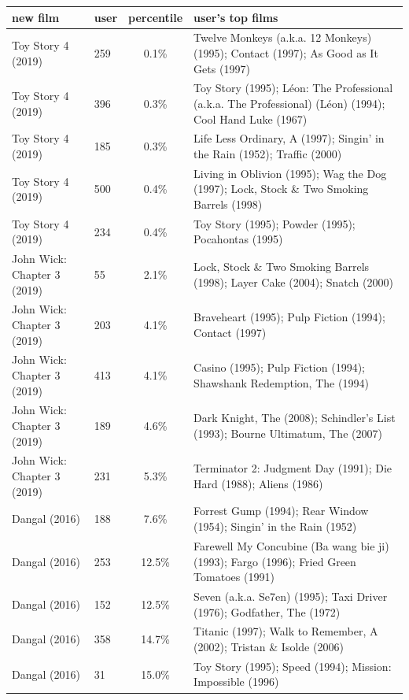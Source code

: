 \begin{tabular}{llcp{6cm}}
\toprule
new film & user & percentile & user's top films \\
\midrule
Toy Story 4 (2019) & 259 & 0.1\% & Twelve Monkeys (a.k.a. 12 Monkeys) (1995); Contact (1997); As Good as It Gets (1997) \\
Toy Story 4 (2019) & 396 & 0.3\% & Toy Story (1995); Léon: The Professional (a.k.a. The Professional) (Léon) (1994); Cool Hand Luke (1967) \\
Toy Story 4 (2019) & 185 & 0.3\% & Life Less Ordinary, A (1997); Singin' in the Rain (1952); Traffic (2000) \\
Toy Story 4 (2019) & 500 & 0.4\% & Living in Oblivion (1995); Wag the Dog (1997); Lock, Stock \& Two Smoking Barrels (1998) \\
Toy Story 4 (2019) & 234 & 0.4\% & Toy Story (1995); Powder (1995); Pocahontas (1995) \\
John Wick: Chapter 3 (2019) & 55 & 2.1\% & Lock, Stock \& Two Smoking Barrels (1998); Layer Cake (2004); Snatch (2000) \\
John Wick: Chapter 3 (2019) & 203 & 4.1\% & Braveheart (1995); Pulp Fiction (1994); Contact (1997) \\
John Wick: Chapter 3 (2019) & 413 & 4.1\% & Casino (1995); Pulp Fiction (1994); Shawshank Redemption, The (1994) \\
John Wick: Chapter 3 (2019) & 189 & 4.6\% & Dark Knight, The (2008); Schindler's List (1993); Bourne Ultimatum, The (2007) \\
John Wick: Chapter 3 (2019) & 231 & 5.3\% & Terminator 2: Judgment Day (1991); Die Hard (1988); Aliens (1986) \\
Dangal (2016) & 188 & 7.6\% & Forrest Gump (1994); Rear Window (1954); Singin' in the Rain (1952) \\
Dangal (2016) & 253 & 12.5\% & Farewell My Concubine (Ba wang bie ji) (1993); Fargo (1996); Fried Green Tomatoes (1991) \\
Dangal (2016) & 152 & 12.5\% & Seven (a.k.a. Se7en) (1995); Taxi Driver (1976); Godfather, The (1972) \\
Dangal (2016) & 358 & 14.7\% & Titanic (1997); Walk to Remember, A (2002); Tristan \& Isolde (2006) \\
Dangal (2016) & 31 & 15.0\% & Toy Story (1995); Speed (1994); Mission: Impossible (1996) \\
\bottomrule
\end{tabular}
